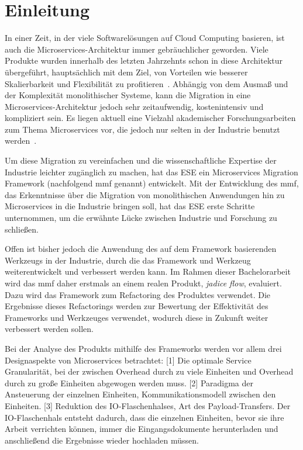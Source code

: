 \chapter{Einleitung}
\label{chap:einleitung}

In einer Zeit, in der viele Softwarelösungen auf Cloud Computing basieren, ist auch die Microservices-Architektur immer gebräuchlicher geworden.
Viele Produkte wurden innerhalb des letzten Jahrzehnts schon in diese Architektur übergeführt, hauptsächlich mit dem Ziel, von Vorteilen wie besserer Skalierbarkeit und Flexibilität zu profitieren~\cite{Fritzsch_2019}.
Abhängig von dem Ausmaß und der Komplexität monolithischer Systeme, kann die Migration in eine Microservices-Architektur jedoch sehr zeitaufwendig, kostenintensiv und kompliziert sein.
Es liegen aktuell eine Vielzahl akademischer Forschungsarbeiten zum Thema Microservices vor, die jedoch nur selten in der Industrie benutzt werden~\cite{fritzsch2022architecturecentric}.

Um diese Migration zu vereinfachen und die wissenschaftliche Expertise der Industrie leichter zugänglich zu machen, hat das ESE ein Microservices Migration Framework (nachfolgend \acrshort{mmf} genannt) entwickelt.
Mit der Entwicklung des \acrshort{mmf}, das Erkenntnisse über die Migration von monolithischen Anwendungen hin zu Microservices in die Industrie bringen soll, hat das ESE erste Schritte unternommen, um die erwähnte Lücke zwischen Industrie und Forschung zu schließen.

Offen ist bisher jedoch die Anwendung des auf dem Framework basierenden Werkzeugs in der Industrie, durch die das Framework und Werkzeug weiterentwickelt und verbessert werden kann.
Im Rahmen dieser Bachelorarbeit wird das \acrshort{mmf} daher erstmals an einem realen Produkt, \emph{jadice flow}, evaluiert.
Dazu wird das Framework zum Refactoring des Produktes verwendet.
Die Ergebnisse dieses Refactorings werden zur Bewertung der Effektivität des Frameworks und Werkzeuges verwendet, wodurch diese in Zukunft weiter verbessert werden sollen.

Bei der Analyse des Produkts mithilfe des Frameworks werden vor allem drei Designaspekte von Microservices betrachtet:
[1] Die optimale Service Granularität, bei der zwischen Overhead durch zu viele Einheiten und Overhead durch zu große Einheiten abgewogen werden muss.
[2] Paradigma der Ansteuerung der einzelnen Einheiten, Kommunikationsmodell zwischen den Einheiten.
[3] Reduktion des IO-Flaschenhalses, Art des Payload-Transfers.
Der IO-Flaschenhals entsteht dadurch, dass die einzelnen Einheiten, bevor sie ihre Arbeit verrichten können, immer die Eingangsdokumente herunterladen und anschließend die Ergebnisse wieder hochladen müssen.

